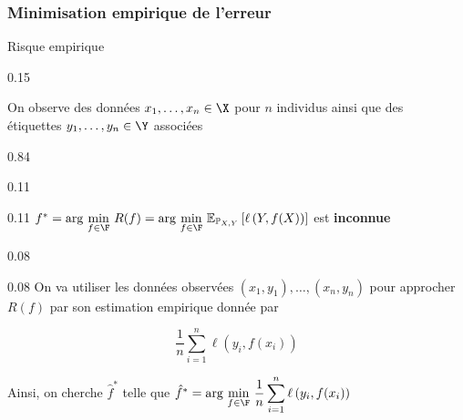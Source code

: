 \documentclass[10pt]{beamer}
\newcommand{\hsp}{\hspace*{1em}}
\begin{document}

\subsubsection{Minimisation empirique de l'erreur}


\begin{frame}{Risque empirique}
	\vspace*{-1.3em}
	\begin{minipt}[1]{0.15}

 \hsp On observe des {données} $x_1,\dots,x_n \in \X$ pour $n$ individus ainsi que des\\
\phantom{\bftitle{Contexte} \hsp} {étiquettes} $y_1,\dots,y_n \in \Y$ associées
\end{minipt}
\begin{minipt}[1]{0.84}
	\begin{minipc}[0.06]{0.11}
	\warning
\end{minipc}
\begin{minipt}[0.93]{0.11}
 $ {f^*= \text{{arg}}\,\min\limits_{f \in \F}\, R(f) = \text{{arg}}\,\min\limits_{f \in \F}\,\mathbb{E}_{\mathbb{P}_{X,Y}} \left[\ell\left(Y,f(X)\right)\right] }$ est \textbf{inconnue}
\end{minipt}
\pause
\begin{minipc}[0.06]{0.08}
		\raisebox{1.5mm}{\bclampe \xspace} 
	\end{minipc}
	\begin{minipc}[0.93]{0.08}
		On va utiliser les données observées $(x_1,y_1), \dots, (x_n, y_n)$ pour approcher $R(f)$ par son estimation empirique donnée par		 
	\end{minipc}
$$ \dfrac{1}{n} \sum_{i=1}^n \ell\left(y_i, f(x_i)\right)$$
\vspace*{1em}

\pause
{} \hsp Ainsi, on cherche $\hat{f}^*$ telle que $ \hat{f}^*= \text{{arg}}\,\min\limits_{f \in \F}\, \dfrac{1}{n} \displaystyle \sum_{i=1}^n \ell\left(y_i, f(x_i)\right)$\\[1.5em]
\pause


\end{minipt}
\end{frame}
\end{document}
